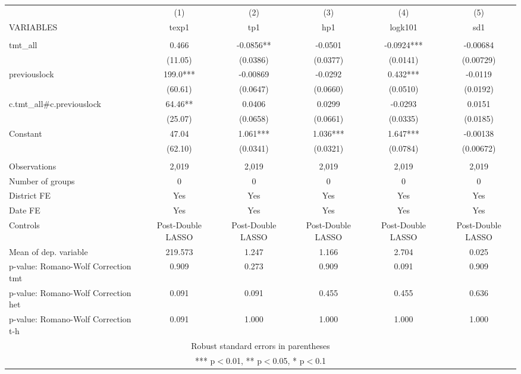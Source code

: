 \documentclass[]{article}
\begin{document}
\begin{tabular}{lccccc} \hline
 & (1) & (2) & (3) & (4) & (5) \\
VARIABLES & texp1 & tp1 & hp1 & logk101 & sd1 \\ \hline
 &  &  &  &  &  \\
tmt\_all & 0.466 & -0.0856** & -0.0501 & -0.0924*** & -0.00684 \\
 & (11.05) & (0.0386) & (0.0377) & (0.0141) & (0.00729) \\
previouslock & 199.0*** & -0.00869 & -0.0292 & 0.432*** & -0.0119 \\
 & (60.61) & (0.0647) & (0.0660) & (0.0510) & (0.0192) \\
c.tmt\_all\#c.previouslock & 64.46** & 0.0406 & 0.0299 & -0.0293 & 0.0151 \\
 & (25.07) & (0.0658) & (0.0661) & (0.0335) & (0.0185) \\
Constant & 47.04 & 1.061*** & 1.036*** & 1.647*** & -0.00138 \\
 & (62.10) & (0.0341) & (0.0321) & (0.0784) & (0.00672) \\
 &  &  &  &  &  \\
Observations & 2,019 & 2,019 & 2,019 & 2,019 & 2,019 \\
Number of groups & 0 & 0 & 0 & 0 & 0 \\
District FE & Yes & Yes & Yes & Yes & Yes \\
Date FE & Yes & Yes & Yes & Yes & Yes \\
Controls & Post-Double LASSO & Post-Double LASSO & Post-Double LASSO & Post-Double LASSO & Post-Double LASSO \\
Mean of dep. variable & 219.573 & 1.247 & 1.166 & 2.704 & 0.025 \\
p-value: Romano-Wolf Correction tmt & 0.909 & 0.273 & 0.909 & 0.091 & 0.909 \\
p-value: Romano-Wolf Correction het & 0.091 & 0.091 & 0.455 & 0.455 & 0.636 \\
 p-value: Romano-Wolf Correction t-h & 0.091 & 1.000 & 1.000 & 1.000 & 1.000 \\ \hline
\multicolumn{6}{c}{ Robust standard errors in parentheses} \\
\multicolumn{6}{c}{ *** p$<$0.01, ** p$<$0.05, * p$<$0.1} \\
\end{tabular}
\end{document}
